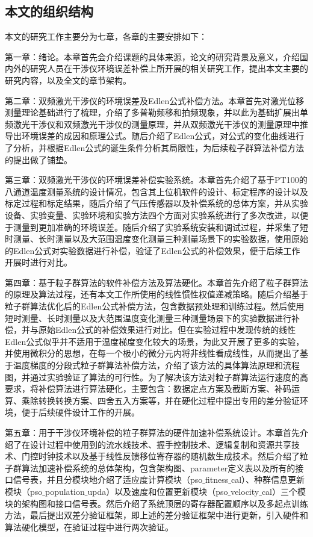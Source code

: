 \subsection{本文的组织结构}
本文的研究工作主要分为七章，各章的主要安排如下：

第一章：绪论。本章首先会介绍课题的具体来源，论文的研究背景及意义，介绍国内外的研究人员在干涉仪环境误差补偿上所开展的相关研究工作，提出本文主要的研究内容，以及全文的章节架构。

第二章：双频激光干涉仪的环境误差及Edlen公式补偿方法。本章首先对激光位移测量理论基础进行了梳理，介绍了多普勒频移和拍频现象，并以此为基础扩展出单频激光干涉仪和双频激光干涉仪的测量原理，并从双频激光干涉仪的测量原理中推导出环境误差的成因和原理公式。随后介绍了Edlen公式，对公式的变化曲线进行了分析，并根据Edlen公式的诞生条件分析其局限性，为后续粒子群算法补偿方法的提出做了铺垫。

第三章：双频激光干涉仪的环境误差补偿实验系统。本章首先介绍了基于PT100的八通道温度测量系统的设计情况，包含其上位机软件的设计、标定程序的设计以及标定过程和标定结果，随后介绍了气压传感器以及补偿系统的总体方案，并从实验设备、实验变量、实验环境和实验方法四个方面对实验系统进行了多次改进，以便于测量到更加准确的环境误差。随后介绍了实验系统安装和调试过程，并采集了短时测量、长时测量以及大范围温度变化测量三种测量场景下的实验数据，使用原始的Edlen公式对实验数据进行补偿，验证了Edlen公式的补偿效果，便于后续工作开展时进行对比。

第四章：基于粒子群算法的软件补偿方法及算法硬化。本章首先介绍了粒子群算法的原理及算法过程，还有本文工作所使用的线性惯性权值递减策略。随后介绍基于粒子群算法优化后的Edlen公式补偿方法，包含数据预处理和训练过程。然后使用短时测量、长时测量以及大范围温度变化测量三种测量场景下的实验数据进行补偿，并与原始Edlen公式的补偿效果进行对比。但在实验过程中发现传统的线性Edlen公式似乎并不适用于温度梯度变化较大的场景，为此又开展了更多的实验，并使用微积分的思想，在每一个极小的微分元内将非线性看成线性，从而提出了基于温度梯度的分段式粒子群算法补偿方法，介绍了该方法的具体算法原理和流程图，并通过实验验证了算法的可行性。为了解决该方法对粒子群算法运行速度的高要求，将补偿算法进行算法硬化，主要包含：数据定点方案及截断方案、补码运算、乘除转换转换方案、四舍五入方案等，并在硬化过程中提出专用的差分验证环境，便于后续硬件设计工作的开展。

第五章：用于干涉仪环境补偿的粒子群算法的硬件加速补偿系统设计。本章首先介绍了在设计过程中使用到的流水线技术、握手控制技术、逻辑复制和资源共享技术、门控时钟技术以及基于线性反馈移位寄存器的随机数生成技术。然后介绍了粒子群算法加速补偿系统的总体架构，包含架构图、parameter定义表以及所有的接口信号表，并且分模块地介绍了适应度计算模块（pso$\_$fitness$\_$cal）、种群信息更新模块（pso$\_$population$\_$upda）以及速度和位置更新模块（pso$\_$velocity$\_$cal）三个模块的架构图和接口信号表。然后介绍了系统顶层的寄存器配置顺序以及多起点训练方法，最后提出双差分验证框架，即上述的差分验证框架中进行更新，引入硬件和算法硬化模型，在验证过程中进行两次验证。

